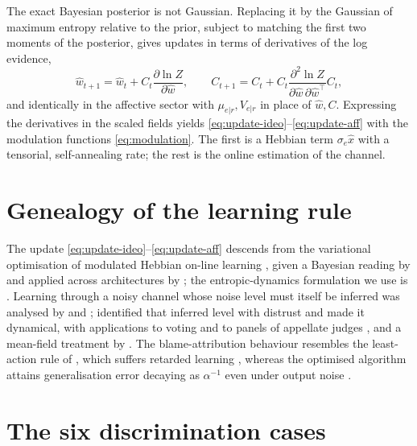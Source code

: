 The exact Bayesian posterior is not Gaussian. Replacing it by the Gaussian of
maximum entropy relative to the prior, subject to matching the first two moments
of the posterior, gives updates in terms of derivatives of the log evidence,
%
\begin{equation}
  \hat{w}_{t+1} = \hat{w}_t + C_t\frac{\partial \ln Z}{\partial \hat{w}},
  \qquad
  C_{t+1} = C_t + C_t \frac{\partial^{2}\ln Z}{\partial\hat{w}\,\partial\hat{w}^{\!\top}} C_t,
\end{equation}
%
and identically in the affective sector with $\mu_{e|r}, V_{e|r}$ in place of
$\hat{w}, C$. Expressing the derivatives in the scaled fields yields
\eqref{eq:update-ideo}--\eqref{eq:update-aff} with the modulation functions
\eqref{eq:modulation}. The first is a Hebbian term $\sigma_e\hat{x}$ with a
tensorial, self-annealing rate; the rest is the online estimation of the channel.

\section{Genealogy of the learning rule}
\label{app:genealogy}

The update \eqref{eq:update-ideo}--\eqref{eq:update-aff} descends from the
variational optimisation of modulated Hebbian on-line learning
\citep{kinouchi1992optimal,kinzel1990improving}, given a Bayesian reading by
\citet{opper1996online,opper1998bayesian} and applied across architectures by
\citet{solla1999optimal}; the entropic-dynamics formulation we use is
\citet{caticha2020entropic}. Learning through a noisy channel whose noise level
must itself be inferred was analysed by \citet{kinouchi1993lower} and
\citet{biehl1995learning}; \citet{alves2016distrust} identified that inferred
level with distrust and made it dynamical, with applications to voting
\citep{caticha2015whom} and to panels of appellate judges
\citep{caticha2019trust}, and a mean-field treatment by \citet{simoes2018mean}.
The blame-attribution behaviour resembles the least-action rule of
\citet{mitchison1989bounds}, which suffers retarded learning
\citep{kabashima1994perfect}, whereas the optimised algorithm attains
generalisation error decaying as $\alpha^{-1}$ even under output noise
\citep{simonetti1996online}.

\section{The six discrimination cases}
\label{app:cases}

